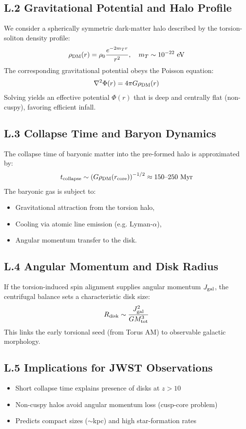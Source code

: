 \documentclass{article}
\begin{document}
\subsection*{L.2 Gravitational Potential and Halo Profile}
We consider a spherically symmetric dark-matter halo described by the torsion-soliton density profile:
\begin{equation}
\rho_{\rm DM}(r) = \rho_0 \frac{e^{-2m_T r}}{r^2}, \quad m_T \sim 10^{-22}~\text{eV}
\end{equation}
The corresponding gravitational potential obeys the Poisson equation:
\begin{equation}
\nabla^2 \Phi(r) = 4\pi G \rho_{\rm DM}(r)
\end{equation}
Solving yields an effective potential $\Phi(r)$ that is deep and centrally flat (non-cuspy), favoring efficient infall.

\subsection*{L.3 Collapse Time and Baryon Dynamics}
The collapse time of baryonic matter into the pre-formed halo is approximated by:
\begin{equation}
t_{\rm collapse} \sim \left(G \rho_{\rm DM}(r_{\rm core})\right)^{-1/2} \approx 150\text{--}250~\text{Myr}
\end{equation}
The baryonic gas is subject to:
\begin{itemize}
  \item Gravitational attraction from the torsion halo,
  \item Cooling via atomic line emission (e.g. Lyman-$\alpha$),
  \item Angular momentum transfer to the disk.
\end{itemize}

\subsection*{L.4 Angular Momentum and Disk Radius}
If the torsion-induced spin alignment supplies angular momentum $J_{\rm gal}$, the centrifugal balance sets a characteristic disk size:
\begin{equation}
R_{\rm disk} \sim \frac{J_{\rm gal}^2}{G M_{\rm tot}^3}
\end{equation}
This links the early torsional seed (from Torus AM) to observable galactic morphology.

\subsection*{L.5 Implications for JWST Observations}
\begin{itemize}
  \item Short collapse time explains presence of disks at $z > 10$
  \item Non-cuspy halos avoid angular momentum loss (cusp-core problem)
  \item Predicts compact sizes ($\sim$kpc) and high star-formation rates
\end{itemize}
\end{document}
